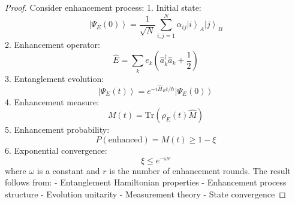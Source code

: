 \documentclass[12pt]{article}
\newcommand{\ket}[1]{\left|#1\right\rangle}
\newcommand{\tr}{\text{Tr}}
\newcommand{\op}[1]{\hat{#1}}
\begin{document}
\begin{proof}
Consider enhancement process:
1. Initial state:
\begin{equation}
\ket{\Psi_E(0)} = \frac{1}{\sqrt{N}}\sum_{i,j=1}^N \alpha_{ij}\ket{i}_A\ket{j}_B
\end{equation}
2. Enhancement operator:
\begin{equation}
\op{E} = \sum_k e_k(\op{a}_k^\dagger\op{a}_k + \frac{1}{2})
\end{equation}
3. Entanglement evolution:
\begin{equation}
\ket{\Psi_E(t)} = e^{-i\op{H}_Et/\hbar}\ket{\Psi_E(0)}
\end{equation}
4. Enhancement measure:
\begin{equation}
M(t) = \tr(\rho_E(t)\op{M})
\end{equation}
5. Enhancement probability:
\begin{equation}
P(\text{enhanced}) = M(t) \geq 1 - \xi
\end{equation}
6. Exponential convergence:
\begin{equation}
\xi \leq e^{-\omega r}
\end{equation}
where $\omega$ is a constant and $r$ is the number of enhancement rounds.
The result follows from:
- Entanglement Hamiltonian properties
- Enhancement process structure
- Evolution unitarity
- Measurement theory
- State convergence
\end{proof}
\end{document}
